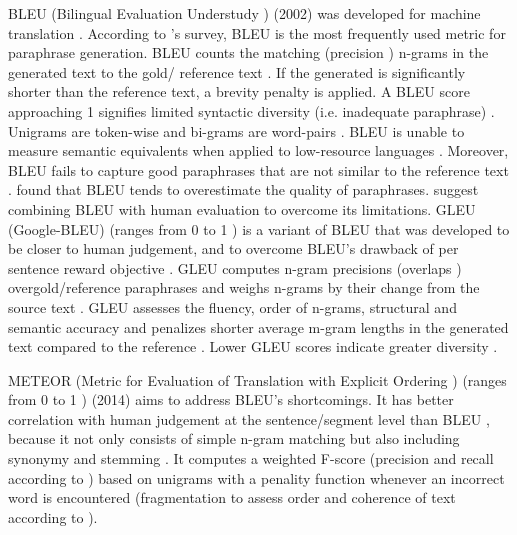 BLEU (Bilingual Evaluation Understudy \cite{palivela_optimization_2021,zhou_paraphrase_2025}) (2002) was developed for machine translation \cite{zhou_paraphrase_2021}.
According to \citet{zhou_paraphrase_2021}'s survey, BLEU is the most frequently used metric for paraphrase generation.
BLEU counts the matching (precision \cite{kurt_pehlivanoglu_comparative_2024}) n-grams in the generated text to the gold/ reference text \cite{palivela_optimization_2021}.
If the generated is significantly shorter than the reference text, a brevity penalty is applied.
A BLEU score approaching 1 signifies limited syntactic diversity (i.e. inadequate paraphrase) \cite{kurt_pehlivanoglu_comparative_2024}.
Unigrams are token-wise and bi-grams are word-pairs \citet{palivela_optimization_2021}.
BLEU is unable to measure semantic equivalents \cite{kurt_pehlivanoglu_comparative_2024,zhou_paraphrase_2021} 
when applied to low-resource languages \cite{zhou_paraphrase_2021}.
Moreover, BLEU fails to capture good paraphrases that are not similar to the reference text \cite{zhou_paraphrase_2021}.
\citet{kurt_pehlivanoglu_comparative_2024} found that BLEU tends to overestimate the quality of paraphrases.
\citet{zhou_paraphrase_2021} suggest combining BLEU with human evaluation to overcome its limitations.
GLEU (Google-BLEU) (ranges from 0 to 1 \cite{kurt_pehlivanoglu_comparative_2024}) is a variant of BLEU that was developed to be closer to human judgement, and to 
overcome BLEU's drawback of per sentence reward objective \cite{palivela_optimization_2021}.
GLEU computes n-gram precisions (overlaps \cite{kurt_pehlivanoglu_comparative_2024}) overgold/reference paraphrases 
and weighs n-grams by their change from the source text \cite{palivela_optimization_2021}.
GLEU assesses the fluency, order of n-grams, structural and semantic accuracy 
and penalizes shorter average m-gram lengths in the generated text compared to the reference \cite{kurt_pehlivanoglu_comparative_2024}.
Lower GLEU scores indicate greater diversity \cite{kurt_pehlivanoglu_comparative_2024}.

METEOR (Metric for Evaluation of Translation with Explicit Ordering \cite{palivela_optimization_2021}) 
(ranges from 0 to 1 \cite{kurt_pehlivanoglu_comparative_2024}) (2014) aims to address BLEU's shortcomings.
It has better correlation with human judgement at the sentence/segment level than BLEU \cite{zhou_paraphrase_2021}, 
because it not only consists of simple n-gram matching but also including synonymy and stemming \cite{kurt_pehlivanoglu_comparative_2024}.
It computes a weighted F-score (precision and recall according to \citet{kurt_pehlivanoglu_comparative_2024}) based on unigrams 
with a penality function whenever an incorrect word is encountered \cite{palivela_optimization_2021} 
(fragmentation to assess order and coherence of text according to \cite{kurt_pehlivanoglu_comparative_2024}).

